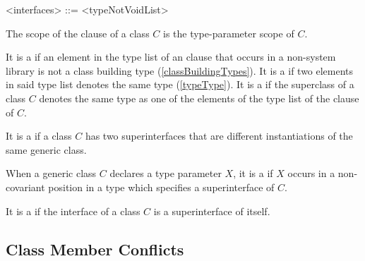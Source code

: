\documentclass[makeidx]{article}
\begin{document}
\begin{grammar}
<interfaces> ::= \IMPLEMENTS{} <typeNotVoidList>
\end{grammar}

\LMHash{}%
The scope of the \IMPLEMENTS{} clause of a class $C$ is
the type-parameter scope of $C$.

\LMHash{}%
It is a  if an element
in the type list of an \IMPLEMENTS{} clause
that occurs in a non-system library
is not a class building type
(\ref{classBuildingTypes}).
It is a  if two elements in said type list
denotes the same type
(\ref{typeType}).
It is a  if the superclass of a class $C$ denotes
the same type as one of the elements of
the type list of the \IMPLEMENTS{} clause of $C$.


\LMHash{}%
It is a  if a class $C$ has two superinterfaces
that are different instantiations of the same generic class.

\LMHash{}%
When a generic class $C$ declares a type parameter $X$,
it is a  if $X$ occurs in a non-covariant position
in a type which specifies a superinterface of $C$.

\LMHash{}%
It is a  if the interface of a class $C$ is
a superinterface of itself.



\subsection{Class Member Conflicts}
\end{document}
